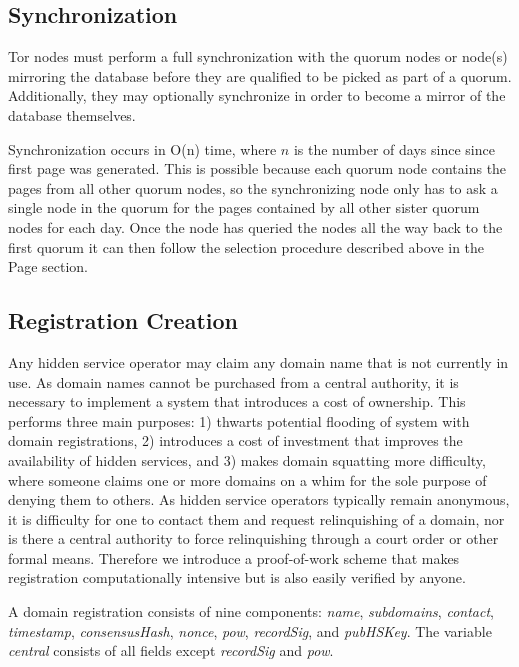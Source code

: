 \subsection{Synchronization}

Tor nodes must perform a full synchronization with the quorum nodes or node(s) mirroring the database before they are qualified to be picked as part of a quorum. Additionally, they may optionally synchronize in order to become a mirror of the database themselves.

Synchronization occurs in O(n) time, where $ n $ is the number of days since since first page was generated. This is possible because each quorum node contains the pages from all other quorum nodes, so the synchronizing node only has to ask a single node in the quorum for the pages contained by all other sister quorum nodes for each day. Once the node has queried the nodes all the way back to the first quorum it can then follow the selection procedure described above in the Page section.

\subsection{Registration Creation}

Any hidden service operator may claim any domain name that is not currently in use. As domain names cannot be purchased from a central authority, it is necessary to implement a system that introduces a cost of ownership. This performs three main purposes: 1) thwarts potential flooding of system with domain registrations, 2) introduces a cost of investment that improves the availability of hidden services, and 3) makes domain squatting more difficulty, where someone claims one or more domains on a whim for the sole purpose of denying them to others. As hidden service operators typically remain anonymous, it is difficulty for one to contact them and request relinquishing of a domain, nor is there a central authority to force relinquishing through a court order or other formal means. Therefore we introduce a proof-of-work scheme that makes registration computationally intensive but is also easily verified by anyone.

A domain registration consists of nine components: \textit{name}, \textit{subdomains}, \textit{contact}, \textit{timestamp}, \textit{consensusHash}, \textit{nonce}, \textit{pow}, \textit{recordSig}, and \textit{pubHSKey}. The variable \textit{central} consists of all fields except \textit{recordSig} and \textit{pow}.

